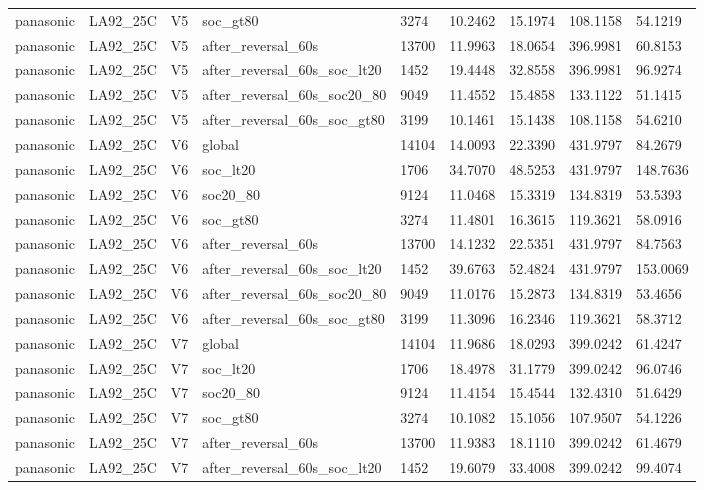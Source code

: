 \begin{tabular}{lllllllll}
panasonic & LA92\_25C & V5 & soc\_gt80 & 3274 & 10.2462 & 15.1974 & 108.1158 & 54.1219 \\
panasonic & LA92\_25C & V5 & after\_reversal\_60s & 13700 & 11.9963 & 18.0654 & 396.9981 & 60.8153 \\
panasonic & LA92\_25C & V5 & after\_reversal\_60s\_soc\_lt20 & 1452 & 19.4448 & 32.8558 & 396.9981 & 96.9274 \\
panasonic & LA92\_25C & V5 & after\_reversal\_60s\_soc20\_80 & 9049 & 11.4552 & 15.4858 & 133.1122 & 51.1415 \\
panasonic & LA92\_25C & V5 & after\_reversal\_60s\_soc\_gt80 & 3199 & 10.1461 & 15.1438 & 108.1158 & 54.6210 \\
panasonic & LA92\_25C & V6 & global & 14104 & 14.0093 & 22.3390 & 431.9797 & 84.2679 \\
panasonic & LA92\_25C & V6 & soc\_lt20 & 1706 & 34.7070 & 48.5253 & 431.9797 & 148.7636 \\
panasonic & LA92\_25C & V6 & soc20\_80 & 9124 & 11.0468 & 15.3319 & 134.8319 & 53.5393 \\
panasonic & LA92\_25C & V6 & soc\_gt80 & 3274 & 11.4801 & 16.3615 & 119.3621 & 58.0916 \\
panasonic & LA92\_25C & V6 & after\_reversal\_60s & 13700 & 14.1232 & 22.5351 & 431.9797 & 84.7563 \\
panasonic & LA92\_25C & V6 & after\_reversal\_60s\_soc\_lt20 & 1452 & 39.6763 & 52.4824 & 431.9797 & 153.0069 \\
panasonic & LA92\_25C & V6 & after\_reversal\_60s\_soc20\_80 & 9049 & 11.0176 & 15.2873 & 134.8319 & 53.4656 \\
panasonic & LA92\_25C & V6 & after\_reversal\_60s\_soc\_gt80 & 3199 & 11.3096 & 16.2346 & 119.3621 & 58.3712 \\
panasonic & LA92\_25C & V7 & global & 14104 & 11.9686 & 18.0293 & 399.0242 & 61.4247 \\
panasonic & LA92\_25C & V7 & soc\_lt20 & 1706 & 18.4978 & 31.1779 & 399.0242 & 96.0746 \\
panasonic & LA92\_25C & V7 & soc20\_80 & 9124 & 11.4154 & 15.4544 & 132.4310 & 51.6429 \\
panasonic & LA92\_25C & V7 & soc\_gt80 & 3274 & 10.1082 & 15.1056 & 107.9507 & 54.1226 \\
panasonic & LA92\_25C & V7 & after\_reversal\_60s & 13700 & 11.9383 & 18.1110 & 399.0242 & 61.4679 \\
panasonic & LA92\_25C & V7 & after\_reversal\_60s\_soc\_lt20 & 1452 & 19.6079 & 33.4008 & 399.0242 & 99.4074 \\

\end{tabular}
